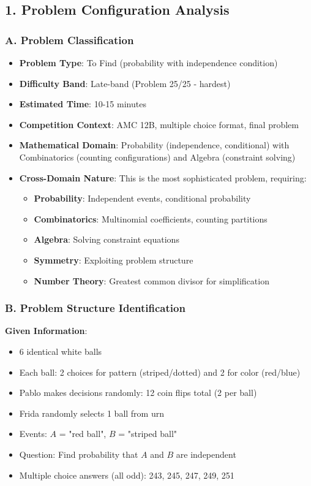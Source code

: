 \documentclass[12pt]{article}
\begin{document}
\begin{problemconfigbox}
\subsection*{1. Problem Configuration Analysis}

\subsubsection*{A. Problem Classification}

\begin{itemize}[leftmargin=*]
    \item \textbf{Problem Type}: To Find (probability with independence condition)
    \item \textbf{Difficulty Band}: Late-band (Problem 25/25 - hardest)
    \item \textbf{Estimated Time}: 10-15 minutes
    \item \textbf{Competition Context}: AMC 12B, multiple choice format, final problem
    \item \textbf{Mathematical Domain}: Probability (independence, conditional) with Combinatorics (counting configurations) and Algebra (constraint solving)
    \item \textbf{Cross-Domain Nature}: This is the most sophisticated problem, requiring:
    \begin{itemize}
        \item \textbf{Probability}: Independent events, conditional probability
        \item \textbf{Combinatorics}: Multinomial coefficients, counting partitions
        \item \textbf{Algebra}: Solving constraint equations
        \item \textbf{Symmetry}: Exploiting problem structure
        \item \textbf{Number Theory}: Greatest common divisor for simplification
    \end{itemize}
\end{itemize}

\subsubsection*{B. Problem Structure Identification}

\textbf{Given Information}:
\begin{itemize}
    \item 6 identical white balls
    \item Each ball: 2 choices for pattern (striped/dotted) and 2 for color (red/blue)
    \item Pablo makes decisions randomly: 12 coin flips total (2 per ball)
    \item Frida randomly selects 1 ball from urn
    \item Events: $A$ = "red ball", $B$ = "striped ball"
    \item Question: Find probability that $A$ and $B$ are independent
    \item Multiple choice answers (all odd): 243, 245, 247, 249, 251
\end{itemize}


\end{problemconfigbox}
\end{document}
